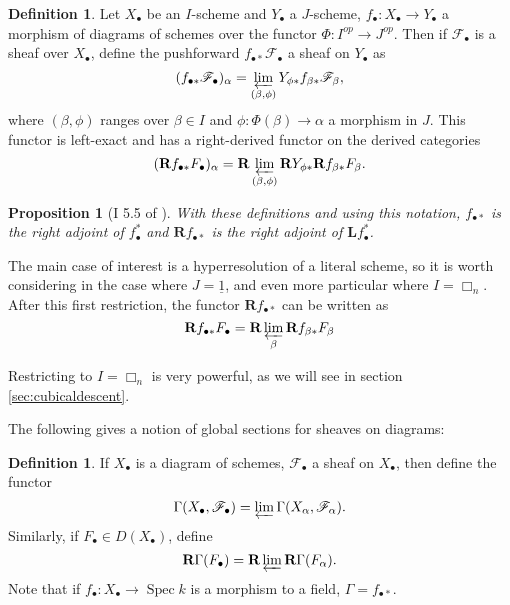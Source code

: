 \documentclass{report}
\newtheorem{prop}[theorem]{Proposition}
\theoremstyle{definition}
\newtheorem{definition}[theorem]{Definition}
\DeclareMathOperator{\Spec}{Spec}
\newcommand{\FF}{\mathscr{F}}
\newcommand{\bL}{\textbf{L}}
\newcommand{\bR}{\textbf{R}}
\begin{document}
\begin{definition}
	\label{def:pushforward}
	Let $X_\bullet$ be an $I$-scheme and $Y_\bullet$ a $J$-scheme, $f_\bullet : X_\bullet \rightarrow Y_\bullet$ a morphism of diagrams of schemes over the functor $\Phi : I^{op} \rightarrow J^{op}$.
	Then if $\FF_\bullet$ is a sheaf over $X_\bullet$, define the pushforward $f_{\bullet*} \FF_\bullet$ a sheaf on $Y_\bullet$ as
	\[
	(f_{\bullet*} \FF_\bullet)_\alpha = \varprojlim_{(\beta, \phi)} Y_{\phi *} f_{\beta *} \FF_\beta,
	\]
	where $(\beta, \phi)$ ranges over $\beta \in I$ and $\phi : \Phi(\beta) \rightarrow \alpha$ a morphism in $J$.
	This functor is left-exact and has a right-derived functor on the derived categories
	\[
	(\bR f_{\bullet*} F_\bullet)_\alpha = \bR \varprojlim_{(\beta, \phi)} \bR Y_{\phi *} \bR f_{\beta *} F_\beta.
	\]
\end{definition}

\begin{prop}[I 5.5 of \cite{Guillen1988}]
	With these definitions and using this notation, $f_{\bullet *}$ is the right adjoint of $f_\bullet^*$ and $\bR f_{\bullet *}$ is the right adjoint of $\bL f_\bullet^*$.
\end{prop}



The main case of interest is a hyperresolution of a literal scheme, so it is worth considering in the case where $J = \underline{1}$, and even more particular where $I = \Box_n$.
After this first restriction, the functor $\bR f_{\bullet *}$ can be written as
\[
\bR f_{\bullet*} F_\bullet = \bR \varprojlim_\beta \bR f_{\beta *} F_\beta
\]

Restricting to $I = \Box_n$ is very powerful, as we will see in section \ref{sec:cubicaldescent}.

The following gives a notion of global sections for sheaves on diagrams:

\begin{definition}
	If $X_\bullet$ is a diagram of schemes, $\FF_\bullet$ a sheaf on $X_\bullet$, then define the functor
	\[
	\Gamma(X_\bullet, \FF_\bullet) = \varprojlim \Gamma(X_\alpha, \FF_\alpha).
	\]
	Similarly, if $F_\bullet \in D(X_\bullet)$, define
	\[
	\bR \Gamma(F_\bullet) = \bR \varprojlim \bR \Gamma(F_\alpha).
	\]
	Note that if $f_\bullet : X_\bullet \rightarrow \Spec k$ is a morphism to a field, $\Gamma = f_{\bullet *}$.
\end{definition}
\end{document}
